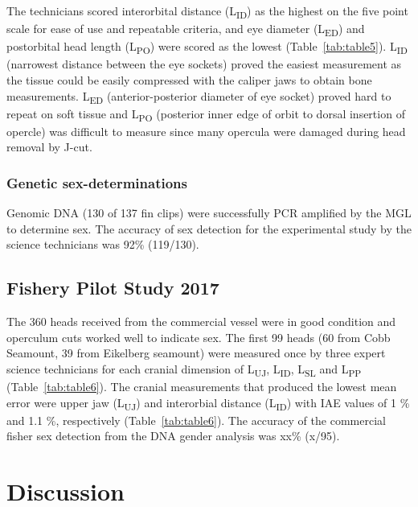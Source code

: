 \documentclass[12pt]{article}\usepackage[]{graphicx}\usepackage[]{color}
\begin{document}
The technicians scored interorbital distance (L\textsubscript{ID}) as the highest on the five point scale for ease of use and repeatable criteria, and eye diameter (L\textsubscript{ED}) and postorbital head length (L\textsubscript{PO}) were scored as the lowest (Table~\ref{tab:table5}). L\textsubscript{ID} (narrowest distance between the eye sockets) proved the easiest measurement as the tissue could be easily compressed with the caliper jaws to obtain bone measurements. L\textsubscript{ED} (anterior-posterior diameter of eye socket) proved hard to repeat on soft tissue and L\textsubscript{PO} (posterior inner edge of orbit to dorsal insertion of opercle) was difficult to measure since many opercula were damaged during head removal by J-cut.

\hypertarget{genetic-sex-determinations}{%
\subsubsection{Genetic sex-determinations}\label{genetic-sex-determinations}}

Genomic DNA (130 of 137 fin clips) were successfully PCR amplified by the MGL to determine sex. The accuracy of sex detection for the experimental study by the science technicians was 92\% (119/130).

\hypertarget{fishery-pilot-study-2017-1}{%
\subsection{Fishery Pilot Study 2017}\label{fishery-pilot-study-2017-1}}

The 360 heads received from the commercial vessel were in good condition and operculum cuts worked well to indicate sex. The first 99 heads (60 from Cobb Seamount, 39 from Eikelberg seamount) were measured once by three expert science technicians for each cranial dimension of L\textsubscript{UJ}, L\textsubscript{ID}, L\textsubscript{SL} and L\textsubscript{PP} (Table~\ref{tab:table6}). The cranial measurements that produced the lowest mean error were upper jaw (L\textsubscript{UJ}) and interorbial distance (L\textsubscript{ID}) with IAE values of 1 \% and 1.1 \%, respectively (Table~\ref{tab:table6}). The accuracy of the commercial fisher sex detection from the DNA gender analysis was xx\% (x/95).

\hypertarget{discussion}{%
\section{Discussion}\label{discussion}}
\end{document}
